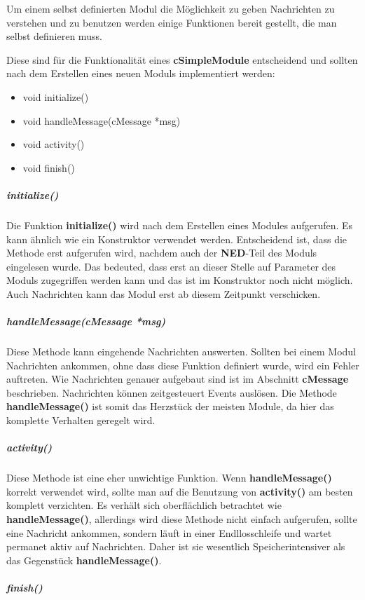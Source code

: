 Um einem selbst definierten Modul die Möglichkeit zu geben Nachrichten zu verstehen und zu benutzen werden einige Funktionen bereit gestellt, die man selbst definieren muss.

Diese sind für die Funktionalität eines \textbf{cSimpleModule} entscheidend und sollten nach dem Erstellen eines neuen Moduls implementiert werden:

\begin{itemize}
\item void initialize()
\item void handleMessage(cMessage *msg)
\item void activity()
\item void finish()
\end{itemize}

\subparagraph{initialize()}

Die Funktion \textbf{initialize()} wird nach dem Erstellen eines Modules aufgerufen. Es kann ähnlich wie ein Konstruktor verwendet werden. Entscheidend ist, dass die Methode erst aufgerufen wird, nachdem auch der \textbf{NED}-Teil des Moduls eingelesen wurde. Das bedeuted, dass erst an dieser Stelle auf Parameter des Moduls zugegriffen werden kann und das ist im Konstruktor noch nicht möglich. Auch Nachrichten kann das Modul erst ab diesem Zeitpunkt verschicken. 

\subparagraph{handleMessage(cMessage *msg)}

Diese Methode kann eingehende Nachrichten auswerten. Sollten bei einem Modul Nachrichten ankommen, ohne dass diese Funktion definiert wurde, wird ein Fehler auftreten. Wie Nachrichten genauer aufgebaut sind ist im Abschnitt \textbf{cMessage} beschrieben.
Nachrichten können zeitgesteuert Events auslösen. Die Methode \textbf{handleMessage()} ist somit das Herzstück der meisten Module, da hier das komplette Verhalten geregelt wird. 

\subparagraph{activity()}

Diese Methode ist eine eher unwichtige Funktion. Wenn \textbf{handleMessage()} korrekt verwendet wird, sollte man auf die Benutzung von \textbf{activity()} am besten komplett verzichten. Es verhält sich oberflächlich betrachtet wie \textbf{handleMessage()}, allerdings wird diese Methode nicht einfach aufgerufen, sollte eine Nachricht ankommen, sondern läuft in einer Endllosschleife und wartet permanet aktiv auf Nachrichten. Daher ist sie wesentlich Speicherintensiver als das Gegenstück \textbf{handleMessage()}.

\subparagraph{finish()}

